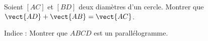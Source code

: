 
\begin{exercice}\label{exosmath-0073}

    Soient \( [AC]\) et \( [BD]\) deux diamètres d'un cercle. Montrer que \( \vect{ AD }+\vect{ AB }=\vect{ AC }\).

    Indice : Montrer que \( ABCD\) est un parallélogramme.

\end{exercice}
